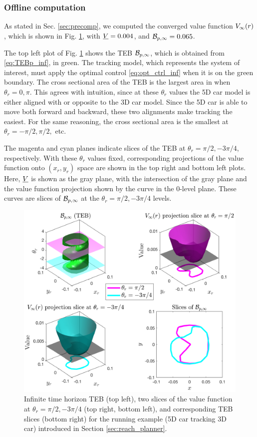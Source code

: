 \subsubsection{Offline computation}

As stated in Sec. \ref{sec:precomp}, we computed the converged value function $V_\infty(r)$, which is shown in Fig. \ref{fig:vf_TEB:5D3D}, with $\underline{V} = 0.004$, and $\mathcal B_{p, \infty} = 0.065$.

The top left plot of Fig. \ref{fig:vf_TEB:5D3D} shows the TEB $\mathcal B_{p, \infty}$, which is obtained from \eqref{eq:TEBp_inf}, in green.
The tracking model, which represents the system of interest, must apply the optimal control \eqref{eq:opt_ctrl_inf} when it is on the green boundary.
The cross sectional area of the TEB is the largest area in when $\theta_r = 0,\pi$. 
This agrees with intuition, since at these $\theta_r$ values the 5D car model is either aligned with or opposite to the 3D car model.
Since the 5D car is able to move both forward and backward, these two alignments make tracking the easiest.
For the same reasoning, the cross sectional area is the smallest at $\theta_r = -\pi/2, \pi/2,$ etc.

The magenta and cyan planes indicate slices of the TEB at $\theta_r = \pi/2, -3\pi/4$, respectively.
With these $\theta_r$ values fixed, corresponding projections of the value function onto $(x_r, y_r)$ space are shown in the top right and bottom left plots.
Here, $\underline{V}$ is shown as the gray plane, with the intersection of the gray plane and the value function projection shown by the curve in the $0$-level plane. 
These curves are slices of $\mathcal B_{p, \infty}$ at the $\theta_r = \pi/2, -3\pi/4$ levels.

\begin{figure}
	\includegraphics[width=\columnwidth]{fig/ti_valfunc_5d3d}
	\caption{Infinite time horizon TEB (top left), two slices of the value function at $\theta_r = \pi/2, -3\pi/4$ (top right, bottom left), and corresponding TEB slices (bottom right) for the running example (5D car tracking 3D car) introduced in Section \ref{sec:reach_planner}.}
	\label{fig:vf_TEB:5D3D}  
\end{figure}

